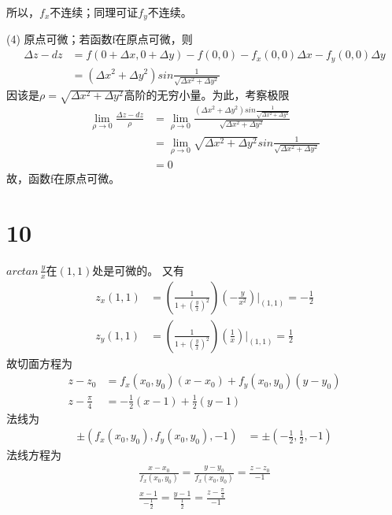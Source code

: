 \documentclass{article}
\begin{document}
所以，$f_x$不连续；同理可证$f_y$不连续。

(4) 原点可微；若函数f在原点可微，则
\begin{align*}
  \Delta z - dz
   & = f(0 + \Delta x, 0 + \Delta y) - f(0, 0) - f_x(0, 0) \Delta x - f_y(0, 0) \Delta y \\
   & = (\Delta x^2 + \Delta y^2) sin \frac{1}{\sqrt{\Delta x^2 + \Delta y^2}}
\end{align*}
因该是$\rho = \sqrt{\Delta x^2 + \Delta y^2}$高阶的无穷小量。为此，考察极限
\begin{align*}
  \lim\limits_{\rho \to 0} \frac{\Delta z - dz}{\rho}
   & = \lim\limits_{\rho \to 0} \frac{(\Delta x^2 + \Delta y^2) sin \frac{1}{\sqrt{\Delta x^2 + \Delta y^2}}}{\sqrt{\Delta x^2 + \Delta y^2}} \\
   & = \lim\limits_{\rho \to 0} \sqrt{\Delta x^2 + \Delta y^2} sin \frac{1}{\sqrt{\Delta x^2 + \Delta y^2}}                                   \\
   & = 0
\end{align*}
故，函数f在原点可微。


\section*{10}

$arctan\, \frac{y}{x}$在$(1, 1)$处是可微的。
又有
\begin{align*}
  z_x(1, 1) & = \left(\frac{1}{1 + (\frac{y}{x})^2}\right)\left(-\frac{y}{x^2}\right) \bigg|_{(1, 1)} = -\frac{1}{2} \\
  z_y(1, 1) & = \left(\frac{1}{1 + (\frac{y}{x})^2}\right)\left(\frac{1}{x}\right)\bigg|_{(1, 1)} = \frac{1}{2}
\end{align*}
故切面方程为
\begin{align*}
  z - z_0           & = f_x(x_0, y_0)(x - x_0) + f_y(x_0, y_0)(y - y_0) \\
  z - \frac{\pi}{4} & = -\frac{1}{2}(x - 1) + \frac{1}{2}(y - 1)
\end{align*}
法线为
\begin{align*}
  \pm(f_x(x_0, y_0), f_y(x_0, y_0), - 1)
   & = \pm(-\frac{1}{2}, \frac{1}{2}, -1)
\end{align*}
法线方程为
\begin{align*}
  \frac{x - x_0}{f_x(x_0, y_0)} = \frac{y - y_0}{f_x(x_0, y_0)} = \frac{z - z_0}{-1}    \\
  \frac{x - 1}{-\frac{1}{2}} = \frac{y - 1}{\frac{1}{2}} = \frac{z - \frac{\pi}{4}}{-1} \\
\end{align*}
\end{document}
